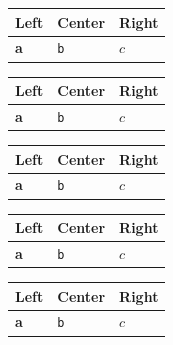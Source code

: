 \par\addvspace{\medskipamount}
\noindent\begin{tabularx}{\linewidth}{@{}>{\raggedright\arraybackslash}X>{\centering\arraybackslash}X>{\raggedleft\arraybackslash}X@{}}
\toprule
Left & Center & Right \\
\midrule
\textbf{a} & \texttt{b} & $c$ \\
\bottomrule
\end{tabularx}
\par\addvspace{\medskipamount}
\par\addvspace{\medskipamount}
\noindent\begin{tabularx}{\linewidth}{@{}>{\raggedright\arraybackslash}X>{\centering\arraybackslash}X>{\raggedleft\arraybackslash}X@{}}
\toprule
Left & Center & Right \\
\midrule
\textbf{a} & \texttt{b} & $c$ \\
\bottomrule
\end{tabularx}
\par\addvspace{\medskipamount}
\par\addvspace{\medskipamount}
\noindent\begin{tabularx}{\linewidth}{@{}>{\raggedright\arraybackslash}X>{\centering\arraybackslash}X>{\raggedleft\arraybackslash}X@{}}
\toprule
Left & Center & Right \\
\midrule
\textbf{a} & \texttt{b} & $c$ \\
\bottomrule
\end{tabularx}
\par\addvspace{\medskipamount}
\begin{frame}[t]
\par\addvspace{\medskipamount}
\noindent\begin{tabularx}{\linewidth}{@{}>{\raggedright\arraybackslash}X>{\centering\arraybackslash}X>{\raggedleft\arraybackslash}X@{}}
\toprule
Left & Center & Right \\
\midrule
\textbf{a} & \texttt{b} & $c$ \\
\bottomrule
\end{tabularx}
\par\addvspace{\medskipamount}
\end{frame}

\begin{frame}[t]
\par\addvspace{\medskipamount}
\noindent\begin{tabularx}{\linewidth}{@{}>{\raggedright\arraybackslash}X>{\centering\arraybackslash}X>{\raggedleft\arraybackslash}X@{}}
\toprule
Left & Center & Right \\
\midrule
\textbf{a} & \texttt{b} & $c$ \\
\bottomrule
\end{tabularx}
\par\addvspace{\medskipamount}
\end{frame}

